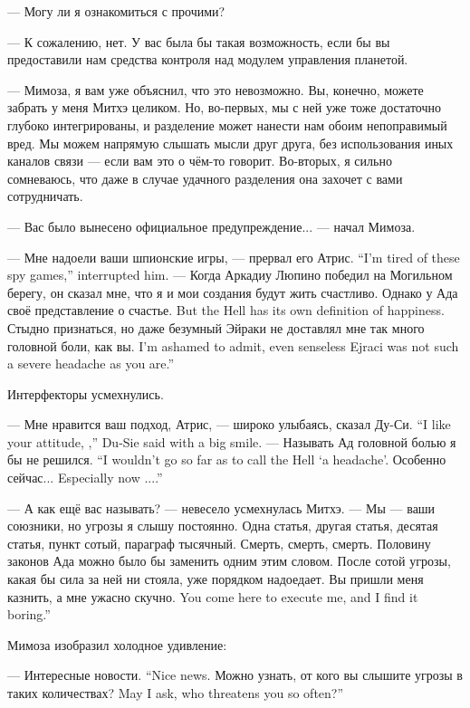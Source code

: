 --- Могу ли я ознакомиться с прочими?

--- К сожалению, нет.
У вас была бы такая возможность, если бы вы предоставили нам средства контроля над модулем управления планетой.

--- Мимоза, я вам уже объяснил, что это невозможно.
Вы, конечно, можете забрать у меня Митхэ целиком.
Но, во-первых, мы с ней уже тоже достаточно глубоко интегрированы, и разделение может нанести нам обоим непоправимый вред.
Мы можем напрямую слышать мысли друг друга, без использования иных каналов связи --- если вам это о чём-то говорит.
Во-вторых, я сильно сомневаюсь, что даже в случае удачного разделения она захочет с вами сотрудничать.

--- Вас было вынесено официальное предупреждение... --- начал Мимоза.

{--- Мне надоели ваши шпионские игры, --- прервал его Атрис.}
{``I'm tired of these spy games,'' \Aatris{} interrupted him.}
--- Когда Аркадиу Люпино победил на Могильном берегу, он сказал мне, что я и мои создания будут жить счастливо.
{Однако у Ада своё представление о счастье.}
{But the Hell has its own definition of happiness.}
{Стыдно признаться, но даже безумный Эйраки не доставлял мне так много головной боли, как вы.}
{I'm ashamed to admit, even senseless Ejraci was not such a severe headache as you are.''}

Интерфекторы усмехнулись.

{--- Мне нравится ваш подход, Атрис, --- широко улыбаясь, сказал Ду-Си.}
{``I like your attitude, \Aatris{},'' Du-Sie said with a big smile.}
{--- Называть Ад головной болью я бы не решился.}
{``I wouldn't go so far as to call the Hell `a headache'.}
{Особенно сейчас...}
{Especially now ....''}

--- А как ещё вас называть? --- невесело усмехнулась Митхэ.
--- Мы --- ваши союзники, но угрозы я слышу постоянно.
Одна статья, другая статья, десятая статья, пункт сотый, параграф тысячный.
Смерть, смерть, смерть.
Половину законов Ада можно было бы заменить одним этим словом.
После сотой угрозы, какая бы сила за ней ни стояла, уже порядком надоедает.
{Вы пришли меня казнить, а мне ужасно скучно.}
{You come here to execute me, and I find it boring.''}

Мимоза изобразил холодное удивление:

{--- Интересные новости.}
{``Nice news.}
{Можно узнать, от кого вы слышите угрозы в таких количествах?}
{May I ask, who threatens you so often?''}

